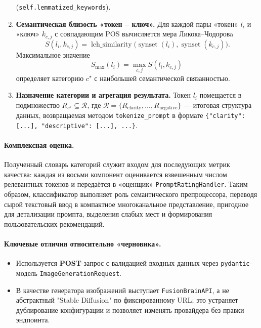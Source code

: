\begin{enumerate}[label=\arabic*]
        (\verb|self.lemmatized_keywords|).
  \item \textbf{Семантическая близость «токен – ключ».}  
        Для каждой пары «токен» \(l_i\) и «ключ» \(k_{c,j}\) с совпадающим
        POS вычисляется мера Ликока–Чодоровa  
      \begin{equation}
      S(l_i,k_{c,j})=\operatorname{lch\_similarity}
      \bigl(\operatorname{synset}(l_i),\operatorname{synset}(k_{c,j})\bigr).
      \end{equation}
        Максимальное значение
      \begin{equation}  
        S_{\text{max}}(l_i)=\max_{c,j}S(l_i,k_{c,j})\
      \end{equation}
        определяет категорию \(c^\star\) с наибольшей
        семантической связанностью.
  \item \textbf{Назначение категории и агрегация результата.}  
        Токен \(l_i\) помещается в подмножество
        \(R_{c^\star}\subseteq\mathcal{R}\), где
        \(\mathcal{R}=\{R_{\text{clarity}},\ldots,R_{\text{negative}}\}\) —
        итоговая структура данных, возвращаемая методом
        \verb|tokenize_prompt| в формате  
        \verb|{"clarity": [...], "descriptive": [...], ...}|.
\end{enumerate}

\paragraph{Комплексная оценка.}
Полученный словарь категорий служит входом для последующих
метрик качества: каждая из восьми компонент оценивается
взвешенным числом релевантных токенов и
передаётся в «оценщик» \verb|PromptRatingHandler|.
Таким образом, классификатор выполняет роль
семантического препроцессора, переводя
сырой текстовый ввод в компактное многоканальное
представление, пригодное для детализации промпта,
выделения слабых мест и формирования
пользовательских рекомендаций.

\paragraph{Ключевые отличия относительно «черновика».}
\begin{itemize}
  \item Используется \textbf{POST}-запрос с валидацией входных данных через
        \verb|pydantic|-модель \verb|ImageGenerationRequest|.
  \item В качестве генератора изображений выступает \texttt{FusionBrainAPI},
        а не абстрактный "Stable Diffusion" по фиксированному URL; это устраняет
        дублирование конфигурации и позволяет изменять провайдера без правки
        эндпоинта.
\end{itemize}

